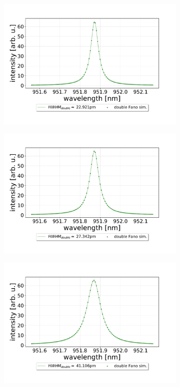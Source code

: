 \begin{figure}[h!]
\begin{subfigure}[b]{0.49\textwidth}
        \includegraphics[width=\textwidth]{figures/results/double fano fits/320um_M3:M5_simfit.pdf}
        \caption{}
        \label{fig:320um_M3:M5_sim}
    \end{subfigure}
    \begin{subfigure}[b]{0.49\textwidth}
        \includegraphics[width=\textwidth]{figures/results/double fano fits/250um_M3:M5_simfit.pdf}
        \caption{}
        \label{fig:250um_M3:M5_sim}
    \end{subfigure}
    \begin{subfigure}[b]{0.49\textwidth}
        \includegraphics[width=\textwidth]{figures/results/double fano fits/120um_M3:M5_simfit.pdf}

\end{subfigure}
\end{figure}

